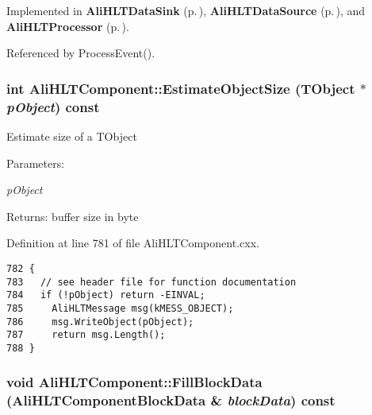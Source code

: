 Implemented in {\bf Ali\-HLTData\-Sink} {\rm (p.\,\pageref{classAliHLTDataSink_a2})}, {\bf Ali\-HLTData\-Source} {\rm (p.\,\pageref{classAliHLTDataSource_a2})}, and {\bf Ali\-HLTProcessor} {\rm (p.\,\pageref{classAliHLTProcessor_a4})}.

Referenced by Process\-Event().
\subsubsection{\setlength{\rightskip}{0pt plus 5cm}int Ali\-HLTComponent::Estimate\-Object\-Size (TObject $\ast$ {\em p\-Object}) const\hspace{0.3cm}{\tt  [protected]}}\label{classAliHLTComponent_b27}


Estimate size of a TObject \begin{Desc}
\item[Parameters:]
\begin{description}
\item[{\em p\-Object}]\end{description}
\end{Desc}
\begin{Desc}
\item[Returns:]buffer size in byte \end{Desc}


Definition at line 781 of file Ali\-HLTComponent.cxx.

\footnotesize\begin{verbatim}782 {
783   // see header file for function documentation
784   if (!pObject) return -EINVAL;
785     AliHLTMessage msg(kMESS_OBJECT);
786     msg.WriteObject(pObject);
787     return msg.Length();  
788 }
\end{verbatim}\normalsize 


\subsubsection{\setlength{\rightskip}{0pt plus 5cm}void Ali\-HLTComponent::Fill\-Block\-Data ({\bf Ali\-HLTComponent\-Block\-Data} \& {\em block\-Data}) const\hspace{0.3cm}{\tt  [protected]}}\label{classAliHLTComponent_b0}


